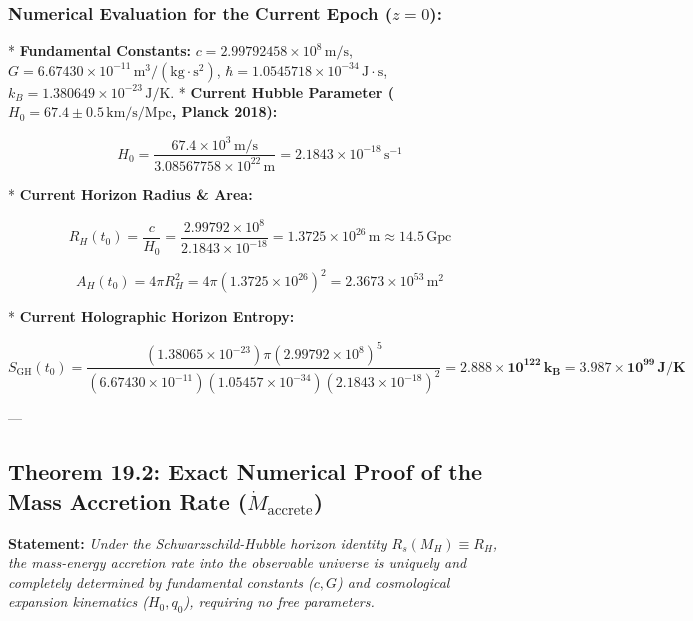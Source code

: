 \documentclass[11pt,a4paper]{article}
\theoremstyle{definition}
\theoremstyle{remark}
\begin{document}
\subsubsection{Numerical Evaluation for the Current Epoch ($z = 0$):}
* \textbf{Fundamental Constants:}  
  $c = 2.99792458 \times 10^8 \, \mathrm{m/s}$, $G = 6.67430 \times 10^{-11} \, \mathrm{m^3/(kg \cdot s^2)}$, $\hbar = 1.0545718 \times 10^{-34} \, \mathrm{J \cdot s}$, $k_B = 1.380649 \times 10^{-23} \, \mathrm{J/K}$.
* \textbf{Current Hubble Parameter ($H_0 = 67.4 \pm 0.5 \, \mathrm{km/s/Mpc}$, Planck 2018):}  
  
\begin{equation}
H_0 = \frac{67.4 \times 10^3 \, \mathrm{m/s}}{3.08567758 \times 10^{22} \, \mathrm{m}} = 2.1843 \times 10^{-18} \, \mathrm{s^{-1}}
\end{equation}

* \textbf{Current Horizon Radius \& Area:}  
  
\begin{equation}
R_H(t_0) = \frac{c}{H_0} = \frac{2.99792 \times 10^8}{2.1843 \times 10^{-18}} = 1.3725 \times 10^{26} \, \mathrm{m} \approx 14.5 \, \mathrm{Gpc}
\end{equation}

  
\begin{equation}
A_H(t_0) = 4\pi R_H^2 = 4\pi (1.3725 \times 10^{26})^2 = 2.3673 \times 10^{53} \, \mathrm{m^2}
\end{equation}

* \textbf{Current Holographic Horizon Entropy:}  
  
\begin{equation}
S_{\text{GH}}(t_0) = \frac{(1.38065 \times 10^{-23}) \pi (2.99792 \times 10^8)^5}{(6.67430 \times 10^{-11})(1.05457 \times 10^{-34})(2.1843 \times 10^{-18})^2} = \mathbf{2.888 \times 10^{122} \, k_B} = \mathbf{3.987 \times 10^{99} \, J/K}
\end{equation}


---

\subsection{Theorem 19.2: Exact Numerical Proof of the Mass Accretion Rate ($\dot{M}_{\text{accrete}}$)}

\textbf{Statement:} \textit{Under the Schwarzschild-Hubble horizon identity $R_s(M_H) \equiv R_H$, the mass-energy accretion rate into the observable universe is uniquely and completely determined by fundamental constants ($c, G$) and cosmological expansion kinematics ($H_0, q_0$), requiring no free parameters.}
\end{document}
